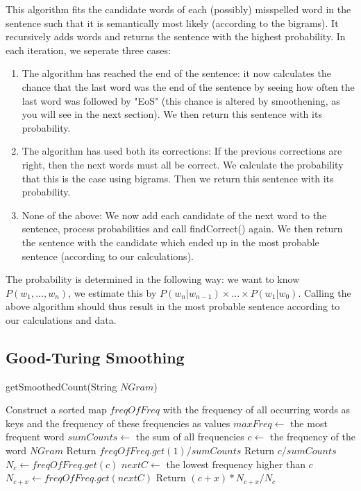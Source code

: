 \documentclass[a4paper,twoside,11pt]{article}
\begin{document}
This algorithm fits the candidate words of each (possibly) misspelled word in the sentence such that it is semantically most likely (according to the bigrams). It recursively adds words and returns the sentence with the highest probability. In each iteration, we seperate three cases:
\begin{enumerate}
\item The algorithm has reached the end of the sentence: it now calculates the chance that the last word was the end of the sentence by seeing how often the last word was followed by "EoS" (this chance is altered by smoothening, as you will see in the next section). We then return this sentence with its probability.
\item The algorithm has used both its corrections: If the previous corrections are right, then the next words must all be correct. We calculate the probability that this is the case using bigrams. Then we return this sentence with its probability.
\item None of the above: We now add each candidate of the next word to the sentence, process probabilities and call findCorrect() again. We then return the sentence with the candidate which ended up in the most probable sentence (according to our calculations).
\end{enumerate}
The probability is determined in the following way: we want to know $P(w_1,...,w_n)$, we estimate this by $P(w_n|w_{n-1})\times...\times P(w_1|w_0)$.
Calling the above algorithm should thus result in the most probable sentence according to our calculations and data.

\subsection{Good-Turing Smoothing}
\begin{algorithm} [H]
\caption{getSmoothedCount(String $NGram$)}\label{euclid}
\begin{algorithmic}
\State Construct a sorted map $freqOfFreq$ with the frequency of all occurring words as keys and the frequency of these frequencies as values
\State $maxFreq \gets$ the most frequent word
\State $sumCounts \gets$ the sum of all frequencies
\State $c \gets$ the frequency of the word $NGram$
  \State Return $freqOfFreq.get(1) / sumCounts$
  \State Return $c / sumCounts$
\Else
  \State $N_c \gets freqOfFreq.get(c)$
  \State $nextC \gets$ the lowest frequency higher than $c$
  \State $N_{c+x} \gets freqOfFreq.get(nextC)$
  \State Return $(c + x) * N_{c+x} / N_c$
\EndIf
\end{algorithmic}
\end{algorithm}
\end{document}
